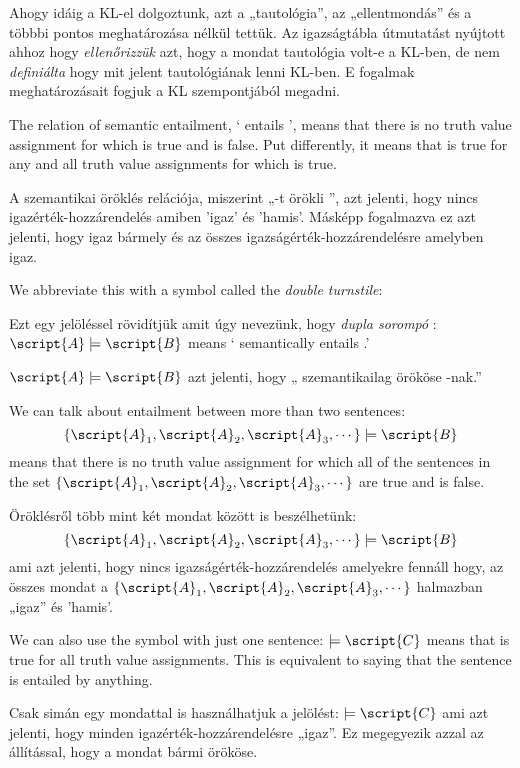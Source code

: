 Ahogy idáig a KL-el dolgoztunk, azt a „tautológia”, az „ellentmondás” és a többbi pontos meghatározása nélkül tettük. Az igazságtábla útmutatást nyújtott ahhoz hogy \emph{ellenőrizzük} azt, hogy a mondat tautológia volt-e a KL-ben, de nem \emph{definiálta} hogy mit jelent tautológiának lenni KL-ben. E fogalmak meghatározásait fogjuk a KL szempontjából megadni.

The relation of semantic entailment, ` entails ', means that there is no truth value assignment for which  is true and  is false. Put differently, it means that  is true for any and all truth value assignments for which  is true.

A szemantikai öröklés relációja, miszerint „-t örökli ”, azt jelenti, hogy nincs igazérték-hozzárendelés amiben  'igaz' és  'hamis'. Másképp fogalmazva ez azt jelenti, hogy  igaz bármely és az összes igazságérték-hozzárendelésre amelyben  igaz.

We abbreviate this with a symbol called the \emph{double turnstile}:

Ezt egy jelöléssel rövidítjük amit úgy nevezünk, hogy \emph{dupla sorompó
}:
$\script{A}\models\script{B}$ means ` semantically entails .'

$\script{A}\models\script{B}$ azt jelenti, hogy „ szemantikailag örököse -nak.”

We can talk about entailment between more than two sentences: $$\{\script{A}_1,\script{A}_2,\script{A}_3,\cdots\}\models\script{B}$$ means that there is no truth value assignment for which all of the sentences in the set $\{\script{A}_1,\script{A}_2,\script{A}_3,\cdots\}$ are true and  is false.

Öröklésről több mint két mondat között is beszélhetünk: $$\{\script{A}_1,\script{A}_2,\script{A}_3,\cdots\}\models\script{B}$$ ami azt jelenti, hogy nincs igazságérték-hozzárendelés amelyekre fennáll hogy, az összes mondat a $\{\script{A}_1,\script{A}_2,\script{A}_3,\cdots\}$ halmazban „igaz” és  'hamis'.

We can also use the symbol with just one sentence: $\models\script{C}$ means that  is true for all truth value assignments. This is equivalent to saying that the sentence is entailed by anything.

Csak simán egy mondattal is használhatjuk a jelölést: $\models\script{C}$ ami azt jelenti, hogy  minden igazérték-hozzárendelésre „igaz”. Ez megegyezik azzal az állítással, hogy a mondat bármi örököse.

